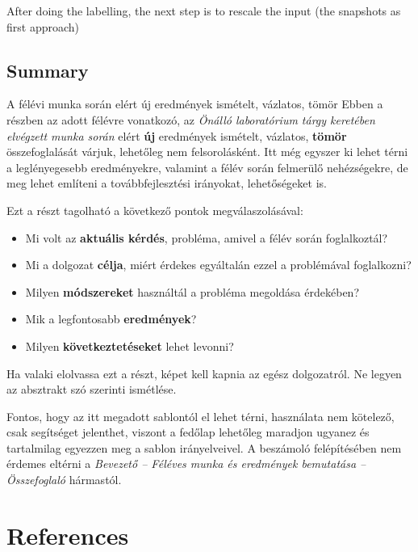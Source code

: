 \documentclass[11pt,a4paper,oneside]{article}
\begin{document}
  After doing the labelling, the next step is to rescale the input (the snapshots as first approach)

\subsection{Summary}
\label{sec:summary}

A félévi munka során elért új eredmények ismételt, vázlatos, tömör
Ebben a részben az adott félévre vonatkozó, az \emph{Önálló
  laboratórium tárgy keretében elvégzett munka során} elért
\textbf{új} eredmények ismételt, vázlatos, \textbf{tömör}
összefoglalását várjuk, lehetőleg nem felsorolásként.  Itt még egyszer
ki lehet térni a leglényegesebb eredményekre, valamint a félév során
felmerülő nehézségekre, de meg lehet említeni a továbbfejlesztési
irányokat, lehetőségeket is.

Ezt a részt tagolható a következő pontok megválaszolásával:
\begin{itemize}
\item Mi volt az \textbf{aktuális kérdés}, probléma, amivel a félév
  során foglalkoztál?
\item Mi a dolgozat \textbf{célja}, miért érdekes egyáltalán ezzel a
  problémával foglalkozni?
\item Milyen \textbf{módszereket} használtál a probléma megoldása
  érdekében?
\item Mik a legfontosabb \textbf{eredmények}?
\item Milyen \textbf{következtetéseket} lehet levonni?

\end{itemize}

Ha valaki elolvassa ezt a részt, képet kell kapnia az egész
dolgozatról.  Ne legyen az absztrakt szó szerinti ismétlése.

Fontos, hogy az itt megadott sablontól el lehet térni, használata nem
kötelező, csak segítséget jelenthet, viszont a fedőlap lehetőleg
maradjon ugyanez és tartalmilag egyezzen meg a sablon irányelveivel. A
beszámoló felépítésében nem érdemes eltérni a \emph{Bevezető --
  Féléves munka és eredmények bemutatása -- Összefoglaló} hármastól.

\newpage
\section{References}
\label{sec:irod-es-csatl}
\end{document}
